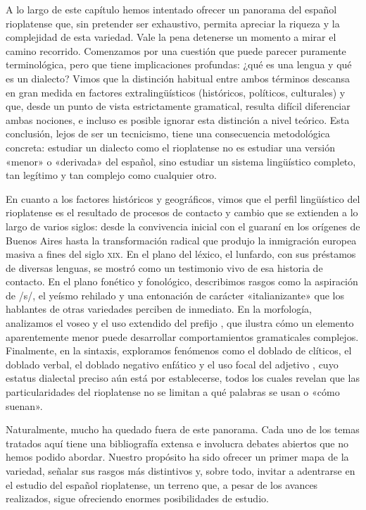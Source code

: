 \begin{recuadro}
A lo largo de este capítulo hemos intentado ofrecer un panorama del español
rioplatense que, sin pretender ser exhaustivo, permita apreciar la riqueza y la
complejidad de esta variedad. Vale la pena detenerse un momento a mirar el camino
recorrido. Comenzamos por una cuestión que puede parecer puramente
terminológica, pero que tiene implicaciones profundas: ¿qué es una lengua y qué
es un dialecto? Vimos que la distinción habitual entre ambos términos descansa en
gran medida en factores extralingüísticos (históricos, políticos, culturales) y
que, desde un punto de vista estrictamente gramatical, resulta difícil
diferenciar ambas nociones, e incluso es posible ignorar esta distinción a nivel
teórico. Esta conclusión, lejos de ser un tecnicismo, tiene una consecuencia
metodológica concreta: estudiar un dialecto como el rioplatense no es estudiar
una versión «menor» o «derivada» del español, sino estudiar un sistema
lingüístico completo, tan legítimo y tan complejo como cualquier otro.

En cuanto a los factores históricos y geográficos, vimos que el perfil
lingüístico del rioplatense es el resultado de procesos de contacto y cambio que
se extienden a lo largo de varios siglos: desde la convivencia inicial con el
guaraní en los orígenes de Buenos Aires hasta la transformación radical que
produjo la inmigración europea masiva a fines del siglo \textsc{xix}. En el plano
del léxico, el lunfardo, con sus préstamos de diversas lenguas, se mostró como un
testimonio vivo de esa historia de contacto. En el plano fonético y fonológico,
describimos rasgos como la aspiración de /s/, el yeísmo rehilado y una
entonación de carácter «italianizante» que los hablantes de otras variedades
perciben de inmediato. En la morfología, analizamos el voseo y el uso extendido
del prefijo , que ilustra cómo un elemento aparentemente menor puede
desarrollar comportamientos gramaticales complejos. Finalmente, en la sintaxis,
exploramos fenómenos como el doblado de clíticos, el doblado verbal, el doblado
negativo enfático y el uso focal del adjetivo , cuyo estatus
dialectal preciso aún está por establecerse, todos los cuales revelan que las
particularidades del rioplatense no se limitan a qué palabras se usan o «cómo
suenan».

Naturalmente, mucho ha quedado fuera de este panorama. Cada uno de los temas
tratados aquí tiene una bibliografía extensa e involucra debates abiertos que no
hemos podido abordar. Nuestro propósito ha sido ofrecer un primer mapa de la
variedad, señalar sus rasgos más distintivos y, sobre todo, invitar a adentrarse
en el estudio del español rioplatense, un terreno que, a pesar de los avances
realizados, sigue ofreciendo enormes posibilidades de estudio.
\end{recuadro}

